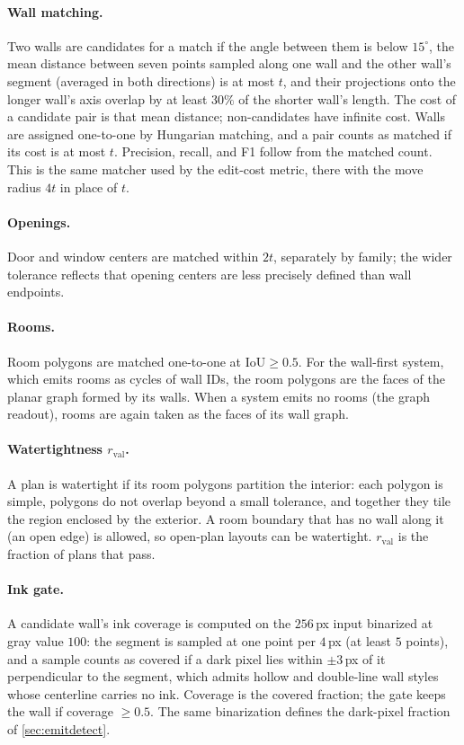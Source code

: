 \documentclass{article}
\begin{document}
\paragraph{Wall matching.} Two walls are candidates for a match if the angle
between them is below $15^\circ$, the mean distance between seven points
sampled along one wall and the other wall's segment (averaged in both
directions) is at most $t$, and their projections onto the longer wall's axis
overlap by at least $30\%$ of the shorter wall's length. The cost of a
candidate pair is that mean distance; non-candidates have infinite cost.
Walls are assigned one-to-one by Hungarian matching, and a pair counts as
matched if its cost is at most $t$. Precision, recall, and F1 follow from the
matched count. This is the same matcher used by the edit-cost metric, there
with the move radius $4t$ in place of $t$.

\paragraph{Openings.} Door and window centers are matched within $2t$,
separately by family; the wider tolerance reflects that opening centers are
less precisely defined than wall endpoints.

\paragraph{Rooms.} Room polygons are matched one-to-one at IoU$\ge0.5$. For
the wall-first system, which emits rooms as cycles of wall IDs, the room
polygons are the faces of the planar graph formed by its walls. When a system
emits no rooms (the graph readout), rooms are again taken as the faces of
its wall graph.

\paragraph{Watertightness $r_{\mathrm{val}}$.} A plan is watertight if its
room polygons partition the interior: each polygon is simple, polygons do not
overlap beyond a small tolerance, and together they tile the region enclosed
by the exterior. A room boundary that has no wall along it (an open edge) is
allowed, so open-plan layouts can be watertight. $r_{\mathrm{val}}$ is the
fraction of plans that pass.

\paragraph{Ink gate.} A candidate wall's ink coverage is computed on the
$256$\,px input binarized at gray value $100$: the segment is sampled at one
point per $4$\,px (at least $5$ points), and a sample counts as covered if a
dark pixel lies within $\pm3$\,px of it perpendicular to the segment, which
admits hollow and double-line wall styles whose centerline carries no ink.
Coverage is the covered fraction; the gate keeps the wall if coverage
$\ge0.5$. The same binarization defines the dark-pixel fraction of
\cref{sec:emitdetect}.
\end{document}

